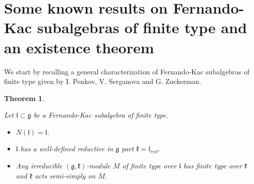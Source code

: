 \documentclass[12pt]{report}
\newtheorem{theo}{Theorem}[section]
\newcommand{\kk}{\mathfrak{k}}
\newcommand{\gG}{\mathfrak{g}}
\newcommand{\lL}{\mathfrak{l}}
\begin{document}
\section{Some known results on Fernando-Kac subalgebras of finite type and an existence theorem}
We start by recalling a general characterization of Fernando-Kac subalgebras of finite type given by I. Penkov, V. Serganova and G. Zuckerman.
\begin{theo} \label{thNec}

\textbf{\cite[Theorem 3.1(1),(3)]{PSZ}}
Let $\lL\subset\gG$ be a Fernando-Kac subalgebra of finite type.
\begin{itemize}
\item[(a)] $N(\lL)=\lL$. 
\item[(b)] $\lL$ has a well-defined reductive in $\gG$ part $\kk=\lL_{red}$.
\item[(c)] Any irreducible $(\gG,\kk)$-module $M$ of finite type over $\lL$ has finite type over $\kk$ and $\kk$ acts semi-simply on $M$.
\end{itemize}
\end{theo}
\end{document}
